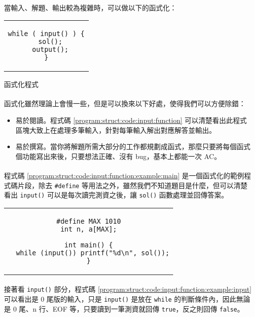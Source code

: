 \documentclass[12pt,a4paper,oneside]{report}
\begin{document}
\begin{CJK}{UTF8}{bkai}
\paragraph{}當輸入、解題、輸出較為複雜時，可以做以下的函式化：

\begin{code}[h!]
\centering
\begin{tabular}{c}
\begin{lstlisting}
while ( input() ) {
  sol();
  output();
}
\end{lstlisting}
\end{tabular}
\caption{函式化程式}
\label{program:struct:code:input:function}
\end{code}

\paragraph{}函式化雖然理論上會慢一些，但是可以換來以下好處，使得我們可以方便除錯：
\begin{itemize}
\item 易於閱讀。程式碼 \ref{program:struct:code:input:function} 可以清楚看出此程式區塊大致上在處理多筆輸入，針對每筆輸入解出對應解答並輸出。
\item 易於撰寫。當你將解題所需大部分的工作都規劃成函式，那麼只要將每個函式個功能寫出來後，只要想法正確、沒有 bug，基本上都能一次 AC。
\end{itemize}
\paragraph{}程式碼 \ref{program:struct:code:input:function:example:main} 是一個函式化的範例程式碼片段，除去 \lstinline!#define! 等用法之外，雖然我們不知道題目是什麼，但可以清楚看出 \lstinline!input()! 可以是每次讀完測資之後，讓 \lstinline!sol()! 函數處理並回傳答案。

\begin{code}[h!]
\centering
\begin{tabular}{c}
\begin{lstlisting}
#define MAX 1010
int n, a[MAX];

int main() {
  while (input()) printf("%d\n", sol());
}
\end{lstlisting}
\end{tabular}
\caption{函式化範例 (\lstinline!main! 部分)}
\label{program:struct:code:input:function:example:main}
\end{code}

\paragraph{}接著看 \lstinline!input()! 部分，程式碼 \ref{program:struct:code:input:function:example:input} 可以看出是 0 尾版的輸入，只是 \lstinline!input()! 是放在 \lstinline!while! 的判斷條件內，因此無論是 0 尾、n 行、EOF 等，只要讀到一筆測資就回傳 \lstinline!true!，反之則回傳 \lstinline!false!。


\end{CJK}
\end{document}
